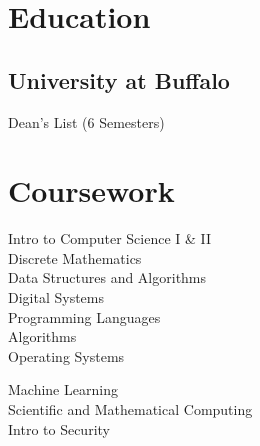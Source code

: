 \documentclass[letterpaper]{deedy-resume} %
\begin{document}
\begin{minipage}[t]{0.33\textwidth} %


\section{Education} 

\subsection{University at Buffalo}

Dean's List (6 Semesters) \\

\sectionspace %


\section{Coursework}

Intro to Computer Science I \& II \\
Discrete Mathematics \\
Data Structures and Algorithms \\
Digital Systems \\ 
Programming Languages \\
Algorithms \\
Operating Systems \\

\sectionspace %

Machine Learning \\
Scientific and Mathematical Computing \\
Intro to Security \\

\sectionspace %



\end{minipage}
\end{document}
